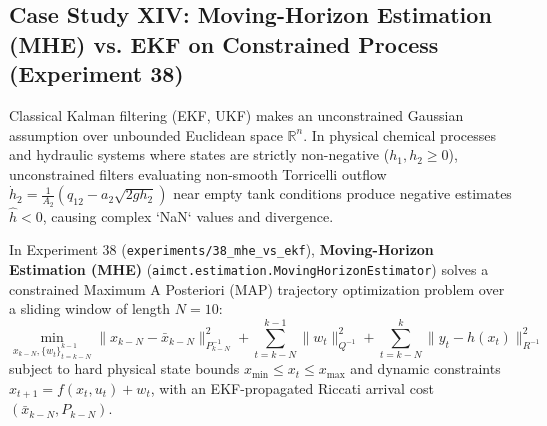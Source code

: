 \documentclass[11pt,a4paper]{article}
\begin{document}
\subsection{Case Study XIV: Moving-Horizon Estimation (MHE) vs. EKF on Constrained Process (Experiment 38)}
\label{sec:exp38_mhe}

Classical Kalman filtering (EKF, UKF) makes an unconstrained Gaussian assumption over unbounded Euclidean space $\mathbb{R}^n$. In physical chemical processes and hydraulic systems where states are strictly non-negative ($h_1, h_2 \ge 0$), unconstrained filters evaluating non-smooth Torricelli outflow $\dot{h}_2 = \frac{1}{A_2}(q_{12} - a_2\sqrt{2gh_2})$ near empty tank conditions produce negative estimates $\hat{h} < 0$, causing complex `NaN` values and divergence.

In Experiment 38 (\texttt{experiments/38\_mhe\_vs\_ekf}), \textbf{Moving-Horizon Estimation (MHE)} (\texttt{aimct.estimation.MovingHorizonEstimator}) solves a constrained Maximum A Posteriori (MAP) trajectory optimization problem over a sliding window of length $N=10$:
\begin{equation}
\min_{x_{k-N}, \{w_t\}_{t=k-N}^{k-1}} \|x_{k-N} - \bar{x}_{k-N}\|_{P_{k-N}^{-1}}^2 + \sum_{t=k-N}^{k-1} \|w_t\|_{Q^{-1}}^2 + \sum_{t=k-N}^k \|y_t - h(x_t)\|_{R^{-1}}^2
\end{equation}
subject to hard physical state bounds $x_{\min} \le x_t \le x_{\max}$ and dynamic constraints $x_{t+1} = f(x_t, u_t) + w_t$, with an EKF-propagated Riccati arrival cost $(\bar{x}_{k-N}, P_{k-N})$.

\begin{table}[H]
\centering
\small
{}
\caption{Benchmark results for Experiment 38: MHE vs. EKF on coupled two-tank process under hard physical boundaries (from \texttt{experiments/38\_mhe\_vs\_ekf/table.md}).}
\label{tab:exp38}
\end{table}
\end{document}
